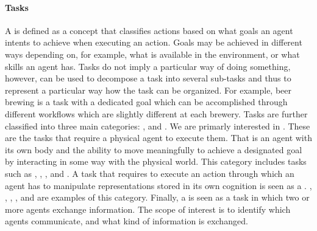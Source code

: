 \paragraph{Tasks}
A  is defined as a concept that classifies actions based on what goals an agent intents to achieve when executing an action.
Goals may be achieved in different ways depending on, for example, what is available in the environment, or what skills an agent has.
Tasks do not imply a particular way of doing something, however,  can be used to decompose a task into several sub-tasks and thus to represent a particular way how the task can be organized.
For example, beer brewing is a task with a dedicated goal which can be accomplished through different workflows which are slightly different at each brewery.
Tasks are further classified into three main categories: ,  and .
We are primarly interested in .
These are the tasks that require a physical agent to execute them.
That is an agent with its own body and the ability to move meaningfully to achieve a designated goal by interacting in some way with the physical world.
This category includes tasks such as , , ,  and . 
A task that requires to execute an action through which an agent has to manipulate representations stored in its own cognition is seen as a .
, , , , and  are examples of this category.
Finally, a  is seen as a task
in which two or more agents exchange information.
The scope of interest is to identify which agents communicate, and what kind of information is exchanged.

